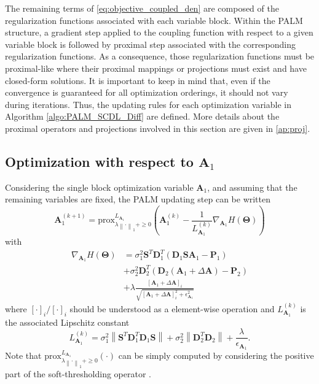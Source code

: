 \documentclass[review]{elsarticle}
\begin{document}
The remaining terms of \eqref{eq:objective_coupled_den} are composed of the regularization functions associated with each variable block. Within the PALM structure, a gradient step applied to the coupling function with respect to a given variable block is followed by proximal step associated with the corresponding regularization functions. As a consequence, those regularization functions must be proximal-like where their proximal mappings or projections must exist and have closed-form solutions. It is important to keep in mind that, even if the convergence is guaranteed for all optimization orderings, it should not vary during iterations. Thus, the updating rules for each optimization variable in Algorithm \ref{algo:PALM_SCDL_Diff} are defined. More details about the proximal operators and projections involved in this section are given in \ref{ap:proj}.

\subsection{Optimization with respect to \texorpdfstring{$\mathbf{A}_{1}$}{A}}

Considering the single block optimization variable $\mathbf{A}_{1}$, and assuming that the remaining variables are fixed, the PALM updating step can be written
\begin{equation}
		\mathbf{A}_{1}^{(k+1)} = \mathrm{prox}^{L_{\mathbf{A}_{1}}}_{\lambda\left\|\cdot\right\|_1 + \geq0}\left(\mathbf{A}_{1}^{(k)} - \frac{1}{L_{\mathbf{A}_{1}}^{(k)} }\nabla_{\mathbf{A}_{1}} H(\boldsymbol{\Theta}) \right)
        \label{eq:code_Update}
\end{equation}
with
\begin{equation}
\begin{aligned}
		\nabla_{\mathbf{A}_{1}} H(\boldsymbol{\Theta}) &= \sigma_{1}^2\mathbf{S}^{T}\mathbf{D}_{1}^{T}\left( \mathbf{D}_{1}\mathbf{S}\mathbf{A}_{1} - \mathbf{P}_{1}\right) \\
&+\sigma_{2}^2\mathbf{D}_{2}^{T}\left( \mathbf{D}_{2}\left(\mathbf{A}_{1} + \Delta\mathbf{A}\right)-\mathbf{P}_{2}\right)  \\
&+ \lambda \frac{\left[\mathbf{A}_{1} + \Delta\mathbf{A}\right]_{i}}{\sqrt{\left[\mathbf{A}_{1} + \Delta\mathbf{A}\right]_{i}^{2} + \epsilon_{\mathbf{A}_{1}}^{2}}}
        \label{eq:nabla_code}
\end{aligned}
\end{equation}
where $[\cdot]_i/[\cdot]_i$ should be understood as a element-wise operation and $L_{\mathbf{A}_{1}}^{(k)}$ is the associated Lipschitz constant
\begin{equation}
		L_{\mathbf{A}_{1}}^{(k)} = \sigma_{1}^2\left\|\mathbf{S}^{T}\mathbf{D}_{1}^{T}\mathbf{D}_{1}\mathbf{S}\right\| +  \sigma_{2}^2\left\|\mathbf{D}_{2}^{T}\mathbf{D}_{2}\right\| + \frac{\lambda}{\epsilon_{\mathbf{A}_{1}}}.
        \label{eq:lip_code}
\end{equation}
Note that $\mathrm{prox}^{L_{\mathbf{A}_{1}}}_{\lambda\left\|\cdot\right\|_1 + \geq0}(\cdot)$ can be simply computed by considering the positive part of the soft-thresholding operator \citep{parikh_proximal_2014}.
\end{document}
